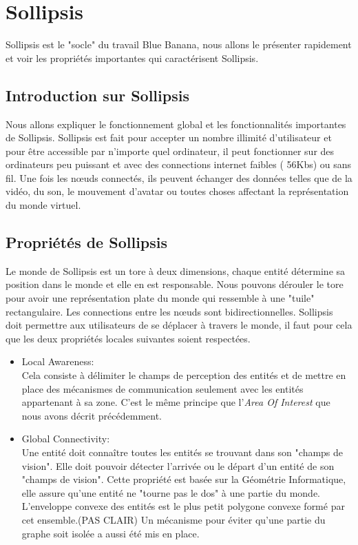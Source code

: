 \section{Sollipsis}
	\label{sollipsis}
	Sollipsis est le "socle" du travail Blue Banana, nous allons le présenter rapidement et voir les propriétés importantes qui caractérisent Sollipsis.
	\subsection{Introduction sur Sollipsis} 
	Nous allons expliquer le fonctionnement global et les fonctionnalités importantes de Sollipsis. Sollipsis est fait pour accepter un nombre illimité d'utilisateur et pour être accessible par n'importe quel ordinateur, il peut fonctionner sur des ordinateurs peu puissant et avec des connections internet faibles ( 56Kbs) ou sans fil. Une fois les nœuds connectés, ils peuvent échanger des données telles que de la vidéo, du son, le mouvement d'avatar ou toutes choses affectant la représentation du monde virtuel. \\
	\subsection{Propriétés de Sollipsis}
	Le monde de Sollipsis est un tore à deux dimensions, chaque entité détermine sa position dans le monde et elle en est responsable. Nous pouvons dérouler le tore pour avoir une représentation plate du monde qui ressemble à une "tuile" rectangulaire. Les connections entre les nœuds sont bidirectionnelles. Sollipsis doit permettre aux utilisateurs de se déplacer à travers le monde, il faut pour cela que les deux propriétés locales suivantes soient respectées.
	\begin{itemize}
		\item Local Awareness:\\
		Cela consiste à délimiter le champs de perception des entités et de mettre en place des mécanismes de communication seulement avec les entités appartenant à sa zone. C'est le même principe que l'\textit{Area Of Interest} que nous avons décrit précédemment. 
		\item Global Connectivity:\\
		Une entité doit connaître toutes les entités se trouvant dans son "champs de vision". Elle doit pouvoir détecter l'arrivée ou le départ d'un entité de son "champs de vision". Cette propriété est basée sur la Géométrie Informatique, elle assure qu'une entité ne "tourne pas le dos" à une partie du monde. L'enveloppe convexe des entités est le plus petit polygone convexe formé par cet ensemble.(PAS CLAIR) Un mécanisme pour éviter qu'une partie du graphe soit isolée a aussi été mis en place.\\
	\end{itemize}

